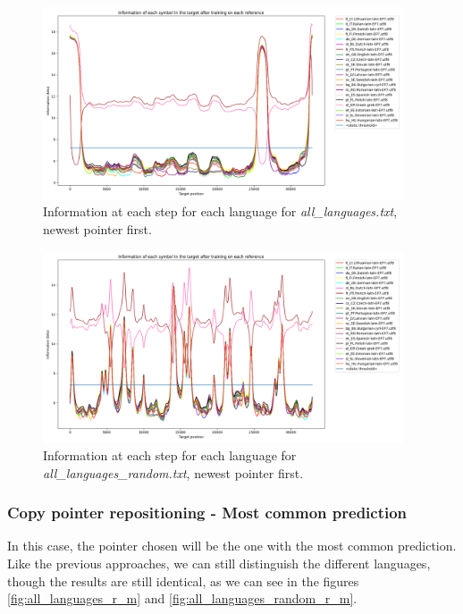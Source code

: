 \documentclass{article}
\begin{document}
\begin{figure}
    \centering
    \includegraphics[width=0.95\textwidth]{../results/all_languages/-r_n.png}
    \caption{Information at each step for each language for \textit{all\_languages.txt}, newest pointer first.}
    \label{fig:all_languages_r_n}
\end{figure}

\begin{figure}
    \centering
    \includegraphics[width=0.95\textwidth]{../results/all_languages_random/-r_n.png}
    \caption{Information at each step for each language for \textit{all\_languages\_random.txt}, newest pointer first.}
    \label{fig:all_languages_random_r_n}
\end{figure}

\subsubsection{Copy pointer repositioning - Most common prediction}
\label{subsubsec:results_locate_lang_most_common_prediction}

In this case, the pointer chosen will be the one with the most common prediction.
Like the previous approaches, we can still distinguish the different languages, though the results are still identical, as we can see in the figures \ref{fig:all_languages_r_m} and \ref{fig:all_languages_random_r_m}.
\end{document}
